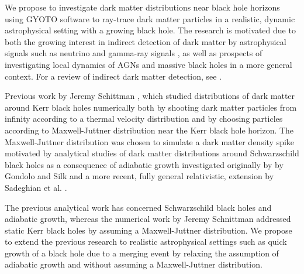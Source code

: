 \documentclass[a4paper,10pt]{article}
\begin{document}

We propose to investigate dark matter distributions near black hole horizons using GYOTO software to ray-trace dark matter 
particles in a realistic, dynamic astrophysical setting with a 
growing black hole. The 
research is motivated due to both the growing interest in indirect 
detection of dark matter by astrophysical signals such as 
neutrino and gamma-ray signals \citep{GS_neutrino_search} 
\citep{indirect_detection_of_dm}, as well as prospects of investigating 
local dynamics of AGNs and massive black holes in a more general 
context. For a review of indirect dark matter detection, see 
\citep{indirect_detection_review}. %

Previous work by Jeremy Schittman 
\citep{schnittman2015}, which studied distributions of dark matter 
around Kerr black holes numerically both by shooting dark matter particles 
from infinity according to a thermal velocity distribution and by 
choosing particles according to Maxwell-Juttner distribution near the 
Kerr black hole horizon. The Maxwell-Juttner distribution was 
chosen to simulate a dark matter density spike motivated by analytical 
studies of dark matter distributions around Schwarzschild black holes 
as a consequence of adiabatic growth investigated originally by 
by Gondolo and Silk \citep{GS_2009} 
and a more recent, fully general relativistic, extension by Sadeghian et al. 
\citep{Laleh_GR_DM_distributions}.

The previous analytical work has concerned Schwarzschild black holes 
and adiabatic growth, whereas the numerical work by Jeremy Schnittman 
addressed static Kerr black holes by assuming a Maxwell-Juttner 
distribution.
We propose to extend the previous research to realistic astrophysical 
settings such as quick growth of a black hole due to a merging event by 
relaxing the assumption of adiabatic growth and without assuming a 
Maxwell-Juttner distribution. 
\end{document}
